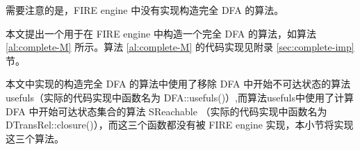 

需要注意的是，FIRE engine 中没有实现构造完全 DFA 的算法。

本文提出一个用于在 FIRE engine 中构造一个完全 DFA 的算法，如算法 \ref{al:complete-M} 所示。算法 \ref{al:complete-M} 的代码实现见附录 \ref{sec:complete-imp} 节。

\begin{remark}
    本文中实现的构造完全 DFA 的算法中使用了移除 DFA 中开始不可达状态的算法usefuls（实际的代码实现中函数名为 DFA::usefuls()）,而算法usefuls中使用了计算 DFA 中开始可达状态集合的算法 SReachable （实际的代码实现中函数名为 DTransRel::closure()），而这三个函数都没有被 FIRE engine 实现，本小节将实现这三个算法。
\end{remark}

